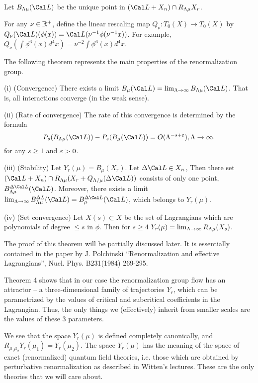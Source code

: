Let $B_{\L\mu}(\Cal L)$ be the unique point in $(\Cal L+X_n)\cap 
R_{\L\mu} X_r$.

For any $\nu \in \Bbb R^+$,
define the linear rescaling map $Q_\nu: T_0(X)\to T_0(X)$ 
by $Q_\nu(\Cal L)(\phi(x))=\Cal L(\nu^{-1}\phi(\nu^{-1} x))$. 
For example, $Q_\nu(\int \phi^6(x)d^4x)=\nu^{-2}\int \phi^6(x)d^4x$. 

The following theorem represents the main properties of
the renormalization group. 


(i) (Convergence) There exists a limit $B_\mu(\Cal L)=\lim_{\L\to\infty}
B_{\L\mu}(\Cal L)$. That is, all interactions converge 
(in the weak sense). 

(ii) (Rate of convergence) 
The rate of this convergence is determined by the formula
$$
P_s(B_{\L\mu}(\Cal L))-P_s(B_\mu(\Cal L))=O(\L^{-s+\e}), \L\to\infty.
$$
for any $s\ge 1$ and $\varepsilon>0$. 

(iii) (Stability)
Let $Y_r(\mu)=B_\mu(X_r)$. Let $\Delta\Cal L\in X_n$,  
Then there set $(\Cal L+X_n)\cap R_{\L\mu}(X_r+Q_{\L/\mu}(\Delta\Cal L))$ consists 
of only one point, $B_{\L\mu}^{\Delta\Cal L}(\Cal L)$. 
Moreover, there  
exists a limit $\lim_{\L\to\infty} B_{\Lambda\mu}^{\Delta
L}(\Cal L)=B_\mu^{\Delta\Cal L}(\Cal L)$, which belongs to $Y_r(\mu)$. 

(iv) (Set convergence) Let $X(s)\subset X$ be the set of 
Lagrangians which are polynomials of degree $\le s$ in $\phi$. 
Then for $s\ge 4$ $Y_r(\mu)=\lim_{\Lambda\to \infty}R_{\Lambda\mu}(X_s)$. 
\endproclaim

The proof of this theorem will be partially discussed later.  
It is essentially contained in the paper by 
J. Polchinski ``Renormalization and effective Lagrangians'',
Nucl. Phys. B231(1984) 269-295.

Theorem 4 shows
that in our case the renormalization group flow has an attractor --
a three-dimensional family of trajectories $Y_r$, which can be parametrized
by the values of critical and subcritical coefficients in the Lagrangian.
Thus, the only things we 
(effectively) inherit from smaller scales 
are the values of these 3 parameters.  

We see that the space $Y_r(\mu)$ is defined
completely canonically, and $R_{\mu_1\mu_2}Y_r(\mu_1)=
Y_r(\mu_2)$. The space $Y_r(\mu)$ has the meaning of the space of
exact (renormalized) quantum field theories, i.e. those which are obtained 
by perturbative renormalization as described in Witten's lectures.
These are the only theories that we will care about. 
 
